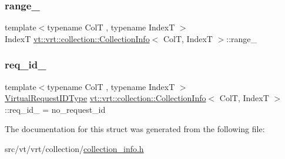 \subsubsection{\texorpdfstring{range\+\_\+}{range\_}}
{\footnotesize\ttfamily template$<$typename ColT , typename IndexT $>$ \\
IndexT \hyperlink{structvt_1_1vrt_1_1collection_1_1_collection_info}{vt\+::vrt\+::collection\+::\+Collection\+Info}$<$ ColT, IndexT $>$\+::range\+\_\+\hspace{0.3cm}{\ttfamily [private]}}

\mbox{\label{structvt_1_1vrt_1_1collection_1_1_collection_info_a8c14351c09d5dc5464e500b2f2de1fe3}} 
\subsubsection{\texorpdfstring{req\+\_\+id\+\_\+}{req\_id\_}}
{\footnotesize\ttfamily template$<$typename ColT , typename IndexT $>$ \\
\hyperlink{namespacevt_1_1vrt_ac7ef8820ebfc383fa16f09bf46eaa2b8}{Virtual\+Request\+I\+D\+Type} \hyperlink{structvt_1_1vrt_1_1collection_1_1_collection_info}{vt\+::vrt\+::collection\+::\+Collection\+Info}$<$ ColT, IndexT $>$\+::req\+\_\+id\+\_\+ = no\+\_\+request\+\_\+id\hspace{0.3cm}{\ttfamily [private]}}



The documentation for this struct was generated from the following file\+:\begin{DoxyCompactItemize}
\item 
src/vt/vrt/collection/\hyperlink{collection__info_8h}{collection\+\_\+info.\+h}\end{DoxyCompactItemize}
